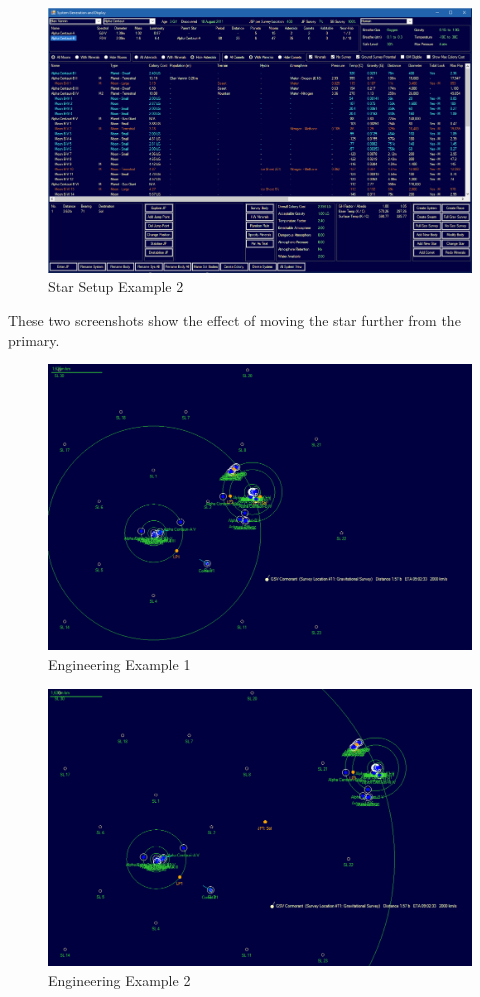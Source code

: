 \documentclass[../Aurora C# unofficial manual.tex]{subfiles}
\begin{document}
	\begin{figure}[H]
		\centering
		\includegraphics[width=0.95\linewidth]{images/StarSetupExample2}
		\caption[Star Setup Example 2]{Star Setup Example 2}
		\label{fig:starsetupexample2}
	\end{figure}

	These two screenshots show the effect of moving the star further from the primary.
	\begin{figure}[H]
		\centering
		\includegraphics[width=0.95\linewidth]{images/Engineering003}
		\caption[Engineering Example]{Engineering Example 1}
		\label{fig:engineering003}
	\end{figure}
	\begin{figure}[H]
		\centering
		\includegraphics[width=0.95\linewidth]{images/Engineering004}
		\caption[Engineering Example 2]{Engineering Example 2}
		\label{fig:engineering004}
	\end{figure}
	
\end{document}
